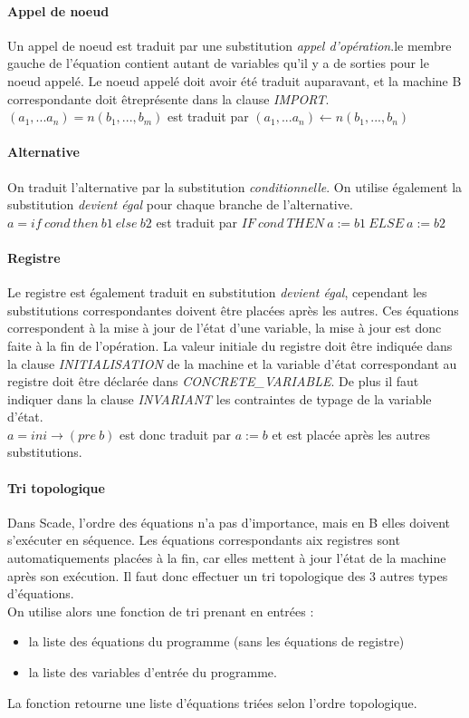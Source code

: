 \paragraph{Appel de noeud}
Un appel de noeud est traduit par une substitution \emph{appel d'opération}.le
membre gauche de l'équation contient autant de variables qu'il y a de sorties
pour le noeud appelé. Le noeud appelé doit avoir été traduit auparavant, et la
machine B correspondante doit êtreprésente dans la clause \emph{IMPORT}.
$(a_1, ... a_n) = n(b_1, ..., b_m)$ est traduit par $(a_1, ... a_n) \leftarrow n(b_1,
..., b_n)$

\paragraph{Alternative}
On traduit l'alternative par la substitution \emph{conditionnelle}. On utilise
également la substitution \emph{devient égal} pour chaque branche de l'alternative.
$ a = if~ cond~ then~ b1~ else~ b2$ est traduit par $IF ~cond~ THEN ~a:=b1~ ELSE
~a:=b2$

\paragraph{Registre}
Le registre est également traduit en substitution \emph{devient égal}, cependant
les substitutions correspondantes doivent être placées après les autres. Ces
équations correspondent à la mise à jour de l'état d'une variable, la mise à
jour est donc faite à la fin de l'opération. La valeur initiale du registre doit
être indiquée dans la clause \emph{INITIALISATION} de la machine et la variable d'état
correspondant au registre doit être déclarée dans \emph{CONCRETE\_VARIABLE}. De
plus il faut indiquer dans la clause \emph{INVARIANT} les contraintes de typage
de la variable d'état. \\
$a = ini \rightarrow (pre ~b)$ est donc traduit par $a := b$ et est placée après les
autres substitutions.

\paragraph{Tri topologique}
Dans Scade, l'ordre des équations n'a pas d'importance, mais en B elles doivent
s'exécuter en séquence. Les équations correspondants aix registres sont
automatiquements placées à la fin, car elles mettent à jour l'état de la machine
après son exécution. Il faut donc effectuer un tri topologique des 3 autres
types d'équations.\\
On utilise alors une fonction de tri prenant en entrées :
\begin{itemize}
\item la liste des équations du programme (sans les équations de registre)
\item la liste des variables d'entrée du programme.
\end{itemize}
La fonction retourne une liste d'équations triées selon l'ordre
topologique.

